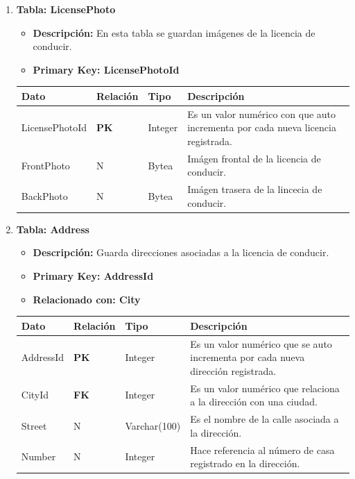 \documentclass[12pt]{article}
\begin{document}
\begin{enumerate}
    \newpage
    \item \textbf{Tabla: LicensePhoto}
    \begin{itemize}
        \item \textbf{Descripción:} En esta tabla se guardan imágenes de la licencia de conducir.
        \item \textbf{Primary Key: LicensePhotoId}
    \end{itemize}
    \begin{table}[!h]
        \centering
        \begin{tabular}{|p{3cm}|p{2cm}|p{2.5cm}|p{8cm}|}
             \hline
             \textbf{Dato} & \textbf{Relación} & \textbf{Tipo} & \textbf{Descripción} \\
             \hline
             LicensePhotoId & \textbf{PK} & Integer & Es un valor numérico con que auto incrementa por cada nueva licencia registrada. \\
             \hline
             FrontPhoto & N & Bytea & Imágen frontal de la licencia de conducir.\\
             \hline
             BackPhoto & N & Bytea & Imágen trasera de la lincecia de conducir.\\
             \hline
        \end{tabular}
    \end{table}

    \item \textbf{Tabla: Address}
    \begin{itemize}
        \item \textbf{Descripción:} Guarda direcciones asociadas a la licencia de conducir.
        \item \textbf{Primary Key: AddressId}
        \item \textbf{Relacionado con: City}
    \end{itemize}
    \begin{table}[!h]
        \centering
        \begin{tabular}{|p{3cm}|p{2cm}|p{2.5cm}|p{8cm}|}
             \hline
             \textbf{Dato} & \textbf{Relación} & \textbf{Tipo} & \textbf{Descripción} \\
             \hline
             AddressId & \textbf{PK} & Integer & Es un valor numérico que se auto incrementa por cada nueva dirección registrada. \\
             \hline
             CityId & \textbf{FK} & Integer & Es un valor numérico que relaciona a la dirección con una ciudad.\\
             \hline
             Street & N & Varchar(100) & Es el nombre de la calle asociada a la dirección.\\
             \hline
             Number & N & Integer & Hace referencia al número de casa registrado en la dirección.\\
             \hline
        \end{tabular}
    \end{table}


\end{enumerate}
\end{document}
